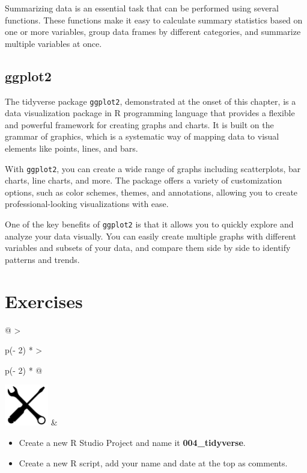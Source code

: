 \documentclass[
]{book}
\begin{document}
Summarizing data is an essential task that can be performed using several functions. These functions make it easy to calculate summary statistics based on one or more variables, group data frames by different categories, and summarize multiple variables at once.

\hypertarget{ggplot2}{%
\subsection{ggplot2}\label{ggplot2}}

The tidyverse package \texttt{ggplot2}, demonstrated at the onset of this chapter, is a data visualization package in R programming language that provides a flexible and powerful framework for creating graphs and charts. It is built on the grammar of graphics, which is a systematic way of mapping data to visual elements like points, lines, and bars.

With \texttt{ggplot2}, you can create a wide range of graphs including scatterplots, bar charts, line charts, and more. The package offers a variety of customization options, such as color schemes, themes, and annotations, allowing you to create professional-looking visualizations with ease.

One of the key benefits of \texttt{ggplot2} is that it allows you to quickly explore and analyze your data visually. You can easily create multiple graphs with different variables and subsets of your data, and compare them side by side to identify patterns and trends.

\hypertarget{exercises-3}{%
\section*{Exercises}\label{exercises-3}}

\begin{longtable}[]{@{}
  >{\raggedright\arraybackslash}p{(\columnwidth - 2\tabcolsep) * }
  >{\raggedright\arraybackslash}p{(\columnwidth - 2\tabcolsep) * }@{}}
\toprule\noalign{}
\endhead
\bottomrule\noalign{}
\endlastfoot
\includegraphics[width=\textwidth,height=0.70833in]{images/07.png} & \begin{minipage}[t]{\linewidth}\raggedright
\begin{itemize}
\item
  Create a new R Studio Project and name it \textbf{004\_tidyverse}.
\item
  Create a new R script, add your name and date at the top as comments.
\end{itemize}
\end{minipage} \\
\end{longtable}
\end{document}
